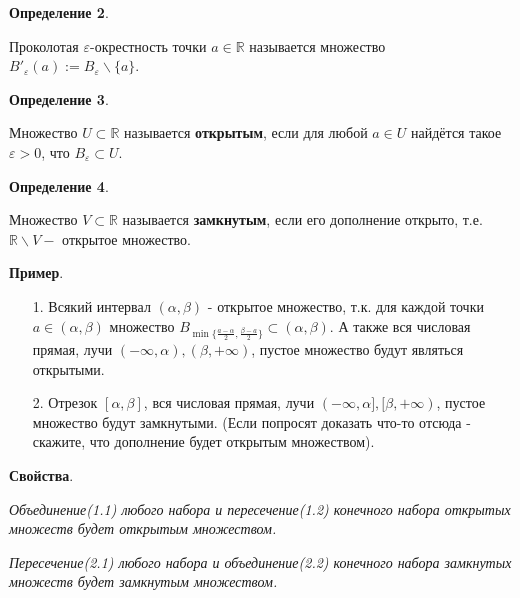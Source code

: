 \documentclass[12pt]{article}
\theoremstyle{definition}
\begin{document}
\textbf{Определение 2}.

Проколотая $\varepsilon$-окрестность точки $a \in\mathbb{R}$ называется множество $B'_\varepsilon(a) := B_\varepsilon \backslash \{a\}$.

\textbf{Определение 3}.

Множество $U\subset\mathbb{R}$ называется \textbf{открытым}, если для любой $a\in U$ найдётся такое $\varepsilon > 0$, что $B_\varepsilon \subset U$.

\textbf{Определение 4}.

Множество $V \subset\mathbb{R}$ называется \textbf{замкнутым}, если его дополнение открыто, т.е. $\mathbb{R} \backslash V - $ открытое множество.

\textbf{Пример}.

\begin{itemize}
    \item[1.] Всякий интервал $(\alpha,\beta)$ - открытое множество, т.к. для каждой точки $a \in (\alpha, \beta)$ множество $B_{\min\{\frac{a-\alpha}{2}, \frac{\beta-a}{2}\}} \subset (\alpha,\beta)$. А также вся числовая прямая, лучи $(-\infty, \alpha), (\beta, +\infty)$, пустое множество будут являться открытыми.
    \item[2.] Отрезок $[\alpha, \beta]$, вся числовая прямая, лучи $(-\infty, \alpha], [\beta, +\infty)$, пустое множество будут замкнутыми. (Если попросят доказать что-то отсюда - скажите, что дополнение будет открытым множеством).
\end{itemize}

\textbf{Свойства}.

\textit{Объединение(1.1) любого набора и пересечение(1.2) конечного набора открытых множеств будет открытым множеством.}

\textit{Пересечение(2.1) любого набора и объединение(2.2) конечного набора замкнутых множеств будет замкнутым множеством.}
\end{document}
